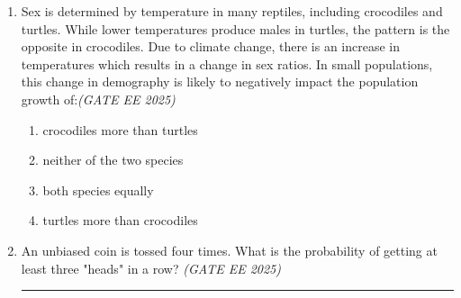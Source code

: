 \documentclass[11pt,a4paper]{article}
\begin{document}
\begin{enumerate}[leftmargin=*,label=\textbf{Q.\arabic*},resume]
\item Sex is determined by temperature in many reptiles, including crocodiles and turtles. While lower temperatures produce males in turtles, the pattern is the opposite in crocodiles. Due to climate change, there is an increase in temperatures which results in a change in sex ratios. In small populations, this change in demography is likely to negatively impact the population growth of:\hfill \textit{(GATE EE 2025)}
\begin{multicols}{2}
\begin{enumerate}[label=(\Alph*)]
\item crocodiles more than turtles
\item neither of the two species
\item both species equally
\item turtles more than crocodiles
\end{enumerate}
\end{multicols}

\item An unbiased coin is tossed four times. What is the probability of getting at least three "heads" in a row? \hfill \textit{(GATE EE 2025)}

\rule{4cm}{0.15mm}


\end{enumerate}
\end{document}
